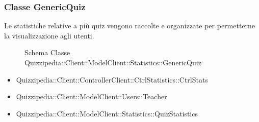 \subsubsection{Classe GenericQuiz}
Le statistiche relative a più quiz vengono raccolte e organizzate per permetterne la visualizzazione agli utenti.
\begin{figure}[H]
\centering
\noindent{}
\caption{Schema Classe Quizzipedia::Client::ModelClient::Statistics::GenericQuiz}
\end{figure}
\begin{itemize}
\item Quizzipedia::Client::ControllerClient::CtrlStatistics::CtrlStats
\item Quizzipedia::Client::ModelClient::Users::Teacher
\end{itemize}
\begin{itemize}
\item Quizzipedia::Client::ModelClient::Statistics::QuizStatistics
\end{itemize}
